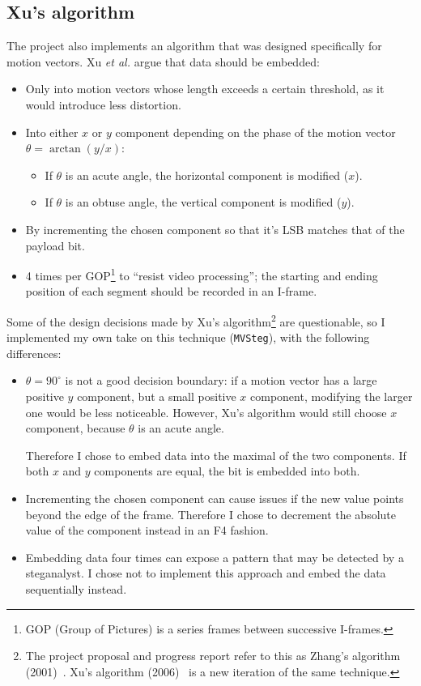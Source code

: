 \documentclass[12pt,british,twoside,notitlepage,usenames,dvipsnames,hypens,final]{report}
\numberwithin{equation}{section}
\numberwithin{figure}{section}
\begin{document}
\subsection{Xu's algorithm}
\label{xu-alg}

The project also implements an algorithm that was designed specifically for motion vectors. Xu \emph{et al.} \cite{xu2006steganography} argue that data should be embedded:
\begin{itemize}
\item Only into motion vectors whose length exceeds a certain threshold, as it would introduce less distortion.
\item Into either $x$ or $y$ component depending on the phase of the motion vector $\theta = \arctan(y/x)$:
    \begin{itemize}
    \item If $\theta$ is an acute angle, the horizontal component is modified ($x$).
    \item If $\theta$ is an obtuse angle, the vertical component is modified ($y$).
    \end{itemize}
\item By incrementing the chosen component so that it's LSB matches that of the payload bit.
\item 4 times per GOP\footnote{GOP (Group of Pictures) is a series frames between successive I-frames.} to ``resist video processing''; the starting and ending position of each segment should be recorded in an I-frame.
\end{itemize}

Some of the design decisions made by Xu's algorithm\footnote{The project proposal and progress report refer to this as Zhang's algorithm (2001)~\cite{zhang2001video}. Xu's algorithm (2006)~\cite{xu2006steganography} is a new iteration of the same technique.} are questionable, so I implemented my own take on this technique (\texttt{MVSteg}), with the following differences:
\begin{itemize}
\item $\theta = 90^{\circ}$ is not a good decision boundary: if a motion vector has a large positive $y$ component, but a small positive $x$ component, modifying the larger one would be less noticeable. However, Xu's algorithm would still choose $x$ component, because $\theta$ is an acute angle. 

Therefore I chose to embed data into the maximal of the two components. If both $x$ and $y$ components are equal, the bit is embedded into both. 

\item Incrementing the chosen component can cause issues if the new value points beyond the edge of the frame. Therefore I chose to decrement the absolute value of the component instead in an F4 fashion.

\item Embedding data four times can expose a pattern that may be detected by a steganalyst. I chose not to implement this approach and embed the data sequentially instead.
\end{itemize}
\end{document}
